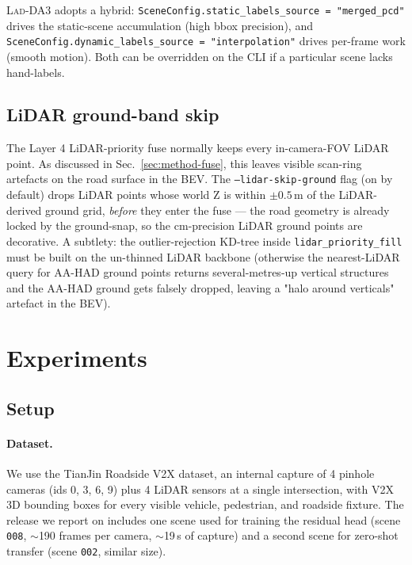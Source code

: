 \documentclass[10pt,twocolumn,letterpaper]{article}
\newcommand{\ourmethod}{\textsc{Lad-DA3}\xspace}
\begin{document}
\ourmethod{} adopts a hybrid: \texttt{SceneConfig.static\_labels\_source
= "merged\_pcd"} drives the static-scene accumulation (high bbox
precision), and \texttt{SceneConfig.dynamic\_labels\_source =
"interpolation"} drives per-frame work (smooth motion). Both can be
overridden on the CLI if a particular scene lacks hand-labels.


\subsection{LiDAR ground-band skip}
\label{sec:impl-skip-ground}

The Layer 4 LiDAR-priority fuse normally keeps every in-camera-FOV
LiDAR point. As discussed in Sec.~\ref{sec:method-fuse}, this leaves
visible scan-ring artefacts on the road surface in the BEV. The
\texttt{--lidar-skip-ground} flag (on by default) drops LiDAR points
whose world Z is within $\pm 0.5$\,m of the LiDAR-derived ground
grid, \emph{before} they enter the fuse — the road geometry is already
locked by the ground-snap, so the cm-precision LiDAR ground points are
decorative. A subtlety: the outlier-rejection KD-tree inside
\texttt{lidar\_priority\_fill} must be built on the un-thinned LiDAR
backbone (otherwise the nearest-LiDAR query for AA-HAD ground points
returns several-metres-up vertical structures and the AA-HAD ground
gets falsely dropped, leaving a "halo around verticals" artefact in
the BEV).


\section{Experiments}
\label{sec:exp}

\subsection{Setup}
\label{sec:exp-setup}

\paragraph{Dataset.} We use the TianJin Roadside V2X dataset, an
internal capture of 4 pinhole cameras (ids 0, 3, 6, 9) plus 4 LiDAR
sensors at a single intersection, with V2X 3D bounding boxes for every
visible vehicle, pedestrian, and roadside fixture. The release we
report on includes one scene used for training the residual head
(scene \texttt{008}, $\sim$190 frames per camera, $\sim$19\,s of
capture) and a second scene for zero-shot transfer (scene
\texttt{002}, similar size).
\end{document}
